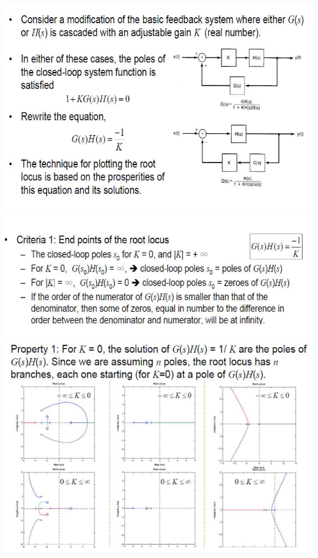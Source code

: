 \documentclass[landscape,a4paper]{article}
\begin{document}
\begin{multicols}{3}
\includegraphics[width=\linewidth]{11.3.png}
\includegraphics[width=\linewidth]{11.4.png}
\includegraphics[width=\linewidth]{11.5.png}


\end{multicols}
\end{document}
